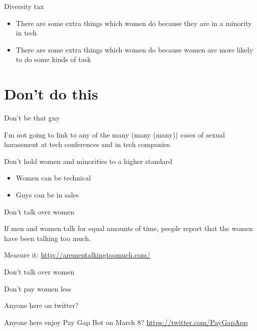 \documentclass[xcolor=table,aspectratio=169]{beamer}
\begin{document}
\begin{frame}{Diversity tax}

\begin{itemize}
	\item There are some extra things which women do because they are in a minority in tech
	\item There are some extra things which women do because women are more likely to do some kinds of task
\end{itemize}

\end{frame}

\section{Don't do this}

\begin{frame}{Don't be that guy}

	I'm not going to link to any of the many (many (many)) cases of sexual harassment at tech conferences and in tech companies. 

\end{frame}

\begin{frame}{Don't hold women and minorities to a higher standard}
	\begin{itemize}
	\item Women can be technical
	\item Guys can be in sales
	\end{itemize}

\end{frame}
\begin{frame}{Don't talk over women}

	If men and women talk for equal amounts of time, people report that the women have been talking too much. 

	\vspace{0.5em}

	Measure it: \url{http://arementalkingtoomuch.com/}


	\vspace{0.5em}


	Don't talk over women

\end{frame}
\begin{frame}{Don't pay women less}

	Anyone here on twitter?

	\vspace{0.5em}

	Anyone here enjoy Pay Gap Bot on March 8? \url{https://twitter.com/PayGapApp}
\end{frame}
\end{document}
